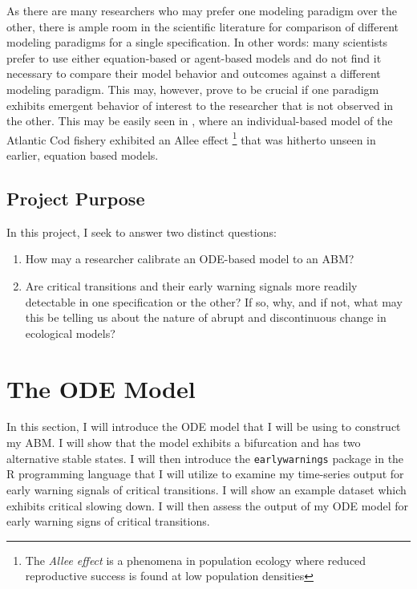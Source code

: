 \documentclass[12pt]{article}
\begin{document}
As there are many researchers who may prefer one modeling paradigm over the other, there is ample room in the scientific literature for comparison of different modeling paradigms for a single specification. In other words: many scientists prefer to use either equation-based or agent-based models and do not find it necessary to compare their model behavior and outcomes against a different modeling paradigm. This may, however, prove  to be crucial if one paradigm exhibits emergent behavior of interest to the researcher that is not observed in the other. This may be easily seen in \cite{Roos2002}, where an individual-based model of the Atlantic Cod fishery exhibited an Allee effect \footnote{The \emph{Allee effect} is a phenomena in population ecology where reduced reproductive success is found at low population densities} that was hitherto unseen in earlier, equation based models. 
\subsection{Project Purpose}
In this project, I seek to answer two distinct questions:
\begin{enumerate}
\item How may a researcher calibrate an ODE-based model to an ABM? 
\item Are critical transitions and their early warning signals more readily detectable in one specification or the other? If so, why, and if not, what may this be telling us about the nature of abrupt and discontinuous change in ecological models? 
\end{enumerate}



\section{The ODE Model}
In this section, I will introduce the ODE model that I will be using to construct my ABM. I will show that the model exhibits a bifurcation and has two alternative stable states. I will then introduce the \texttt{earlywarnings} package in the R programming language that I will utilize to examine my time-series output for early warning signals of critical transitions. I will show an example dataset which exhibits critical slowing down. I will then assess the output of my ODE model for early warning signs of critical transitions.
\end{document}
